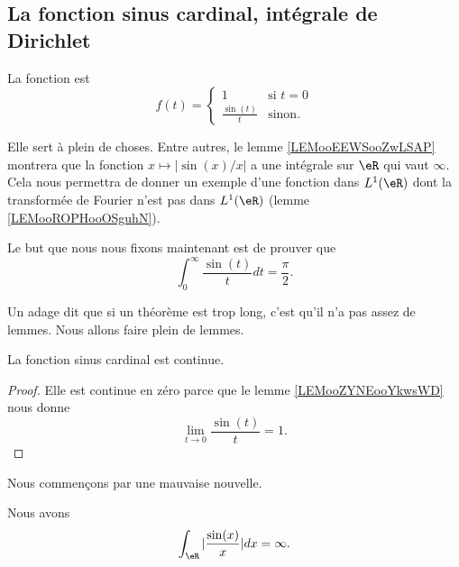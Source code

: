 \subsection{La fonction sinus cardinal, intégrale de Dirichlet}

\begin{definition}
	La fonction  est
	\begin{equation}
		f(t)=\begin{cases}
			1                     & \text{si } t=0 \\
			\frac{ \sin(t) }{ t } & \text{sinon. }
		\end{cases}
	\end{equation}
\end{definition}
Elle sert à plein de choses. Entre autres, le lemme \ref{LEMooEEWSooZwLSAP} montrera que la fonction \( x\mapsto | \sin(x)/x |\) a une intégrale sur \( \eR\) qui vaut \( \infty\). Cela nous permettra de donner un exemple d'une fonction dans \( L^1(\eR)\) dont la transformée de Fourier n'est pas dans \( L^1(\eR)\) (lemme \ref{LEMooROPHooOSguhN}).

\begin{normaltext}
	Le but que nous nous fixons maintenant est de prouver que
	\begin{equation}
		\int_{0}^{\infty}\frac{ \sin(t) }{ t }dt=\frac{ \pi }{2}.
	\end{equation}

	Un adage dit que si un théorème est trop long, c'est qu'il n'a pas assez de lemmes. Nous allons faire plein de lemmes.
\end{normaltext}

\begin{lemma}       \label{LEMooMJFBooAjtNjV}
	La fonction sinus cardinal est continue.
\end{lemma}

\begin{proof}
	Elle est continue en zéro parce que le lemme \ref{LEMooZYNEooYkwsWD} nous donne
	\begin{equation}
		\lim_{t\to 0}\frac{ \sin(t) }{ t }=1.
	\end{equation}
\end{proof}

Nous commençons par une mauvaise nouvelle.
\begin{lemma}           \label{LEMooEEWSooZwLSAP}
	Nous avons
	\begin{equation}
		\int_{\eR}| \frac{ \sin(x) }{ x } |dx=\infty.
	\end{equation}
\end{lemma}

